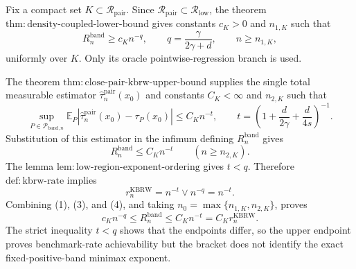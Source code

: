 Fix a compact set \(K\subset\mathcal R_{\mathrm{pair}}\).  Since
\(\mathcal R_{\mathrm{pair}}\subset\mathcal R_{\mathrm{low}}\), the theorem
\(\mathrm{thm:density\mbox{-}coupled\mbox{-}lower\mbox{-}bound}\) gives
constants \(c_K>0\) and \(n_{1,K}\) such that
\[
R_n^{\mathrm{band}}\geq c_Kn^{-q},
\qquad
q=\frac{\gamma}{2\gamma+d},
\qquad n\geq n_{1,K},
\tag{1}
\]
uniformly over \(K\).  Only its oracle pointwise-regression branch is used.

The theorem
\(\mathrm{thm:close\mbox{-}pair\mbox{-}kbrw\mbox{-}upper\mbox{-}bound}\)
supplies the single total measurable estimator
\(\widehat\tau_n^{\mathrm{pair}}(x_0)\) and constants \(C_K<\infty\) and
\(n_{2,K}\) such that
\[
\sup_{P\in\mathcal P_{\mathrm{band},n}}
\mathbb E_P\left|
\widehat\tau_n^{\mathrm{pair}}(x_0)-\tau_P(x_0)
\right|
\leq C_Kn^{-t},
\qquad
t=\left(1+\frac d{2\gamma}+\frac d{4s}\right)^{-1}.
\tag{2}
\]
Substitution of this estimator in the infimum defining
\(R_n^{\mathrm{band}}\) gives
\[
R_n^{\mathrm{band}}\leq C_Kn^{-t}
\qquad(n\geq n_{2,K}).
\tag{3}
\]
The lemma
\(\mathrm{lem:low\mbox{-}region\mbox{-}exponent\mbox{-}ordering}\) gives
\(t<q\).  Therefore \(\mathrm{def:kbrw\mbox{-}rate}\) implies
\[
r_n^{\mathrm{KBRW}}=n^{-t}\vee n^{-q}=n^{-t}.
\tag{4}
\]
Combining (1), (3), and (4), and taking
\(n_0=\max\{n_{1,K},n_{2,K}\}\), proves
\[
c_Kn^{-q}\leq R_n^{\mathrm{band}}
\leq C_Kn^{-t}=C_Kr_n^{\mathrm{KBRW}}.
\]
The strict inequality \(t<q\) shows that the endpoints differ, so the upper
endpoint proves benchmark-rate achievability but the bracket does not identify
the exact fixed-positive-band minimax exponent.